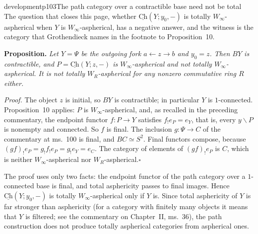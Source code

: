 \begin{dcomment}{development}{p103}{The path category over a contractible base need not be total}
The question that closes this page, whether $\underline{\mathrm{Ch}}(Y;y_0,-)$ is totally $W_\infty$-aspherical when $Y$ is $W_\infty$-aspherical, has a negative answer, and the witness is the category that Grothendieck names in the footnote to Proposition~10.

\textbf{Proposition.}\ours
\textit{Let $Y=\Psi$ be the outgoing fork $a\leftarrow z\to b$ and $y_0=z$. Then $BY$ is contractible, and $P=\underline{\mathrm{Ch}}(Y;z,-)$ is $W_\infty$-aspherical and not totally $W_\infty$-aspherical. It is not totally $W_R$-aspherical for any nonzero commutative ring $R$ either.}

\textit{Proof.}
The object $z$ is initial, so $BY$ is contractible; in particular $Y$ is $1$-connected. Proposition~10 applies: $P$ is $W_\infty$-aspherical, and, as recalled in the preceding commentary, the endpoint functor $f:P\to Y$ satisfies $f_!e_P=e_Y$, that is, every $y\backslash P$ is nonempty and connected. So $f$ is final. The inclusion $g:\Psi\to C$ of the commentary at ms.~100 is final, and $BC\simeq S^2$. Final functors compose, because $(gf)_!e_P=g_!f_!e_P=g_!e_Y=e_C$. The category of elements of $(gf)_!e_P$ is $C$, which is neither $W_\infty$-aspherical nor $W_R$-aspherical.\hfill$\square$

The proof uses only two facts: the endpoint functor of the path category over a $1$-connected base is final, and total asphericity passes to final images. Hence $\underline{\mathrm{Ch}}(Y;y_0,-)$ is totally $W_\infty$-aspherical only if $Y$ is. Since total asphericity of $Y$ is far stronger than asphericity (for a category with finitely many objects it means that $Y$ is filtered; see the commentary on Chapter~II, ms.~36), the path construction does not produce totally aspherical categories from aspherical ones.
\end{dcomment}

